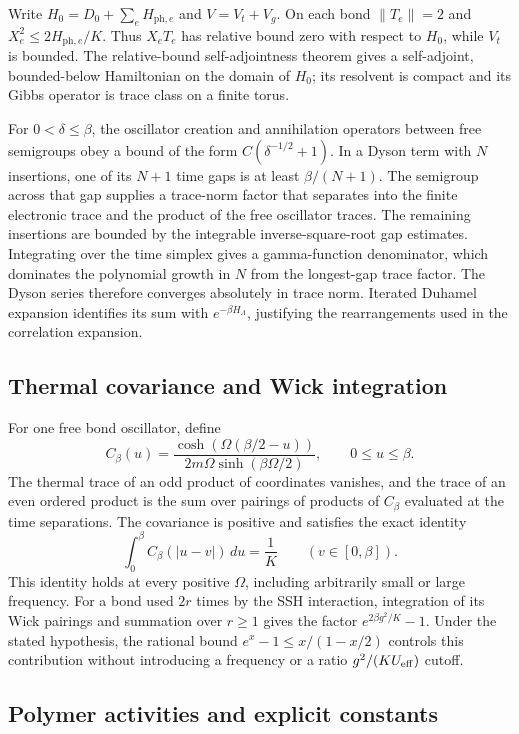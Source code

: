 \documentclass[11pt]{article}
\begin{document}
Write $H_0=D_0+\sum_eH_{\mathrm{ph},e}$ and $V=V_t+V_g$. On each bond $\|T_e\|=2$ and $X_e^2\le 2H_{\mathrm{ph},e}/K$. Thus $X_eT_e$ has relative bound zero with respect to $H_0$, while $V_t$ is bounded. The relative-bound self-adjointness theorem gives a self-adjoint, bounded-below Hamiltonian on the domain of $H_0$; its resolvent is compact and its Gibbs operator is trace class on a finite torus.

For $0<\delta\le\beta$, the oscillator creation and annihilation operators between free semigroups obey a bound of the form $C(\delta^{-1/2}+1)$. In a Dyson term with $N$ insertions, one of its $N+1$ time gaps is at least $\beta/(N+1)$. The semigroup across that gap supplies a trace-norm factor that separates into the finite electronic trace and the product of the free oscillator traces. The remaining insertions are bounded by the integrable inverse-square-root gap estimates. Integrating over the time simplex gives a gamma-function denominator, which dominates the polynomial growth in $N$ from the longest-gap trace factor. The Dyson series therefore converges absolutely in trace norm. Iterated Duhamel expansion identifies its sum with $e^{-\beta H_\Lambda}$, justifying the rearrangements used in the correlation expansion.

\subsection{Thermal covariance and Wick integration}

For one free bond oscillator, define
\[
C_\beta(u)=\frac{\cosh\!\left(\Omega(\beta/2-u)\right)}
{2m\Omega\sinh(\beta\Omega/2)},\qquad 0\le u\le\beta.
\]
The thermal trace of an odd product of coordinates vanishes, and the trace of an even ordered product is the sum over pairings of products of $C_\beta$ evaluated at the time separations. The covariance is positive and satisfies the exact identity
\[
\int_0^\beta C_\beta(|u-v|)\,du=\frac1K
\qquad (v\in[0,\beta]).
\]
This identity holds at every positive $\Omega$, including arbitrarily small or large frequency. For a bond used $2r$ times by the SSH interaction, integration of its Wick pairings and summation over $r\ge1$ gives the factor $e^{2\beta g^2/K}-1$. Under the stated hypothesis, the rational bound $e^x-1\le x/(1-x/2)$ controls this contribution without introducing a frequency or a ratio $g^2/(K U_{\rm eff})$ cutoff.

\subsection{Polymer activities and explicit constants}
\end{document}
